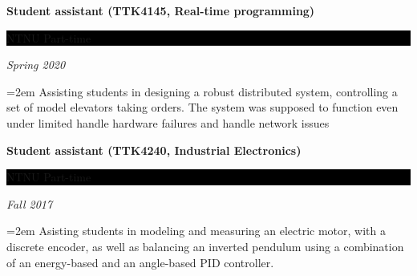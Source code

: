 \documentclass[paper=a4,fontsize=11pt,norsk]{scrartcl} %
\newcommand{\EducationEntry}[4]{
		\noindent \textbf{#1} \hfill      %
		\colorbox{Black}{%
			\parbox{6em}{%
			\hfill\color{White}#2}} \par  %
		\noindent \textit{#3} \par        %
		\noindent\hangindent=2em\hangafter=0 \small #4 %
		\normalsize \par}
\begin{document}




\EducationEntry{Student assistant (TTK4145, Real-time programming)}{NTNU Part-time}{Spring 2020}
{Assisting students in designing a robust distributed system, controlling a set of model elevators taking orders. The system was supposed to function even under limited handle hardware failures and handle network issues}

\EducationEntry{Student assistant (TTK4240, Industrial Electronics)}{NTNU Part-time}{Fall 2017}
{Asisting students in modeling and measuring an electric motor,  with a discrete encoder, as well as balancing an inverted pendulum using a combination of an energy-based and an angle-based PID controller.
}
\end{document}

